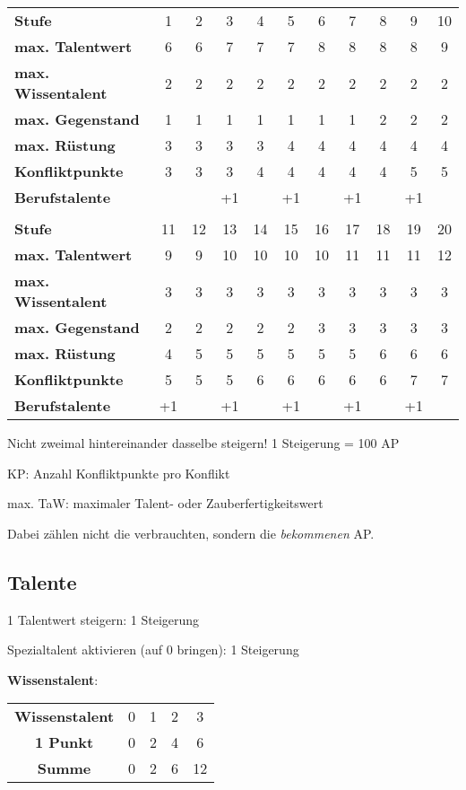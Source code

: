 \begin{tabular}[C]{l*{10}c}
\bf Stufe              & 1 & 2 & 3 & 4 & 5 & 6 & 7 & 8 & 9 & 10 \\
\bf max. Talentwert    & 6 & 6 & 7 & 7 & 7 & 8 & 8 & 8 & 8 & 9  \\
\bf max. Wissentalent  & 2 & 2 & 2 & 2 & 2 & 2 & 2 & 2 & 2 & 2  \\
\bf max. Gegenstand    & 1 & 1 & 1 & 1 & 1 & 1 & 1 & 2 & 2 & 2  \\
\bf max. Rüstung       & 3 & 3 & 3 & 3 & 4 & 4 & 4 & 4 & 4 & 4  \\
\bf Konfliktpunkte     & 3 & 3 & 3 & 4 & 4 & 4 & 4 & 4 & 5 & 5  \\
\bf Berufstalente      &   &   & +1&   & +1&   & +1&   & +1&    \\
\\
\bf Stufe              & 11 & 12 & 13 & 14 & 15 & 16 & 17 & 18 & 19 & 20 \\
\bf max. Talentwert    & 9  & 9  & 10 & 10 & 10 & 10 & 11 & 11 & 11 & 12 \\
\bf max. Wissentalent  & 3  & 3  & 3  & 3  & 3  & 3  & 3  & 3  & 3  & 3  \\
\bf max. Gegenstand    & 2  & 2  & 2  & 2  & 2  & 3  & 3  & 3  & 3  & 3  \\
\bf max. Rüstung       & 4  & 5  & 5  & 5  & 5  & 5  & 5  & 6  & 6  & 6  \\
\bf Konfliktpunkte     & 5  & 5  & 5  & 6  & 6  & 6  & 6  & 6  & 7  & 7  \\
\bf Berufstalente      & +1 &    & +1 &    & +1 &    & +1 &    & +1 &    \\
\end{tabular}

Nicht zweimal hintereinander dasselbe steigern! {1 Steigerung = 100 AP}

KP: Anzahl Konfliktpunkte pro Konflikt

max. TaW: maximaler Talent- oder Zauberfertigkeitswert

Dabei zählen nicht die verbrauchten, sondern die \emph{bekommenen} AP.

\pagebreak[3]
\subsection{Talente}

1 Talentwert steigern: {1 Steigerung}

Spezialtalent aktivieren (auf 0 bringen): {1 Steigerung}

\textbf{Wissenstalent}: 
\begin{tabular}[C]{ccccc}
\bf Wissenstalent & 0 & 1 & 2 & 3 \\
\bf 1 Punkt & 0 & 2 & 4 & 6 \\
\bf Summe & 0 & 2 & 6 & 12 \\
\end{tabular}

